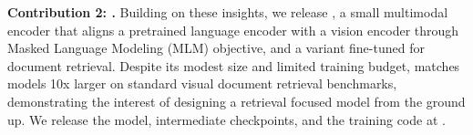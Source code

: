 



\noindent\textbf{Contribution 2: \flagship{}.}\; Building on these insights, we release \flagship{}, a small \flagshipparameters{} multimodal encoder that aligns a pretrained language encoder with a vision encoder through Masked Language Modeling (MLM) objective, and \colflagship{} a variant fine-tuned for document retrieval. Despite its modest size and limited training budget, \colflagship{} matches models 10x larger on standard visual document retrieval benchmarks, demonstrating the interest of designing a retrieval focused model from the ground up. 
We release the model, intermediate checkpoints, and the training code at \repo.




